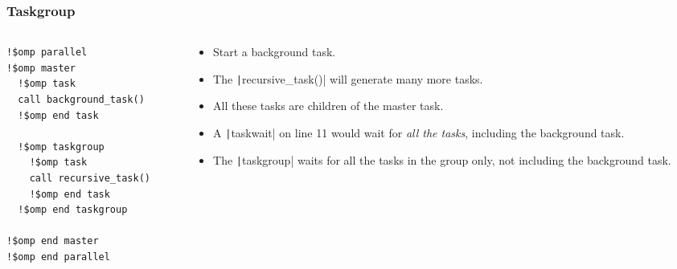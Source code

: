 \documentclass{beamer}
\begin{document}
\begin{frame}[fragile]
\frametitle{Taskgroup}
\begin{columns}
\begin{column}{.5\textwidth}
\begin{verbatim}
!$omp parallel
!$omp master
  !$omp task
  call background_task()
  !$omp end task

  !$omp taskgroup
    !$omp task
    call recursive_task()
    !$omp end task
  !$omp end taskgroup

!$omp end master
!$omp end parallel
\end{verbatim}
\end{column}

\begin{column}{.5\textwidth}
\begin{itemize}
  \item Start a background task.
  \item The \texttt|recursive_task()| will generate many more tasks.
  \item All these tasks are children of the master task.
  \item A \texttt|taskwait| on line 11 would wait for \emph{all the tasks}, including the background task.
  \item The \texttt|taskgroup| waits for all the tasks in the group only, not including the background task.
\end{itemize}
\end{column}
\end{columns}

\end{frame}
\end{document}

